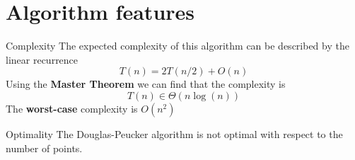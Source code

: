 \documentclass[10pt]{beamer}
\begin{document}
\section{Algorithm features}

\begin{frame}{Complexity}
	The expected complexity of this algorithm can be described by the linear recurrence
	$$
		T(n) = 2 T(n/2)+O(n)
	$$
	Using the \textbf{Master Theorem} we can find that the complexity is
	$$
		T(n) \in \Theta(n \log(n))
	$$ 
	The \textbf{worst-case} complexity is $O(n^2)$	  
\end{frame}

\begin{frame}{Optimality}
	The Douglas-Peucker algorithm is not optimal with respect to the number of points.
	\begin{figure}[h]
		\begin{minipage}[h]{0.49\linewidth}
		\end{minipage}
		\hfill
		\begin{minipage}[h]{0.49\linewidth}

\end{minipage}
\end{figure}
\end{frame}
\end{document}
